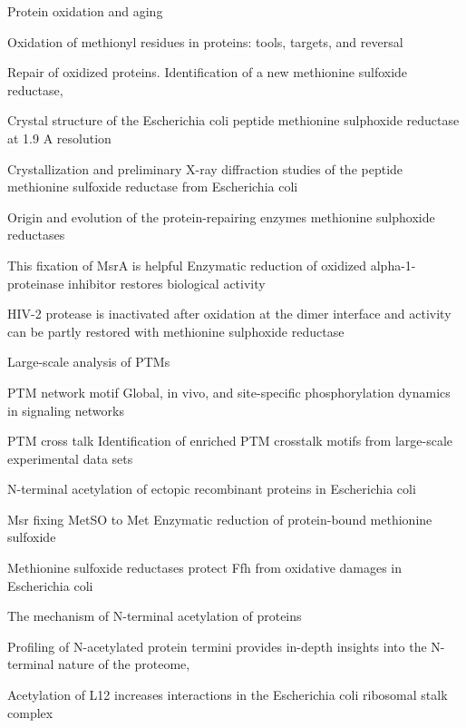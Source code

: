 \documentclass[12pt]{article}
\begin{document}
\cite{Stadtman1992}
{Protein oxidation and aging}

\cite{Vogt1995}
{Oxidation of methionyl residues in proteins: tools, targets, and reversal}

\cite{Grimaudetal2001}
{Repair of oxidized proteins. Identification of a new methionine sulfoxide reductase},

\cite{Tete-Favieretal2000}
{Crystal structure of the Escherichia coli peptide methionine sulphoxide reductase at 1.9 A resolution}
   
\cite{Tete-Favieretal2000b}
{Crystallization and preliminary X-ray diffraction studies of the peptide methionine sulfoxide reductase from Escherichia coli}
   
\cite{ZhangWeissbach2008}
{Origin and evolution of the protein-repairing enzymes methionine sulphoxide reductases}
   
This fixation of MsrA is helpful \cite{Abramsetal1981}
{Enzymatic reduction of oxidized alpha-1-proteinase inhibitor restores biological activity}

\cite{Davisetal2000}
{HIV-2 protease is inactivated after oxidation at the dimer interface and activity can be partly restored with methionine sulphoxide reductase}

Large-scale analysis of PTMs \cite{OlsenMann2013}

PTM network motif \cite{Olsenetal2006}
{Global, in vivo, and site-specific phosphorylation dynamics in signaling networks}

PTM cross talk \cite{Pengetal2014}
{Identification of enriched PTM crosstalk motifs from large-scale experimental data sets}

\cite{Charbautetal2002}
{N-terminal acetylation of ectopic recombinant proteins in Escherichia coli}

Msr fixing MetSO to Met \cite{Brotetal1981}
{Enzymatic reduction of protein-bound methionine sulfoxide}

\cite{Ezratyetal2004}
{Methionine sulfoxide reductases protect Ffh from oxidative damages in Escherichia coli}

\cite{Driessenetal1985}
{The mechanism of N-terminal acetylation of proteins}

\cite{Helbigetal2010}
{Profiling of N-acetylated protein termini provides in-depth insights into the N-terminal nature of the proteome},

\cite{Gordiyenkoetal2008}
 {Acetylation of L12 increases interactions in the Escherichia coli ribosomal stalk complex}
 
\end{document}
